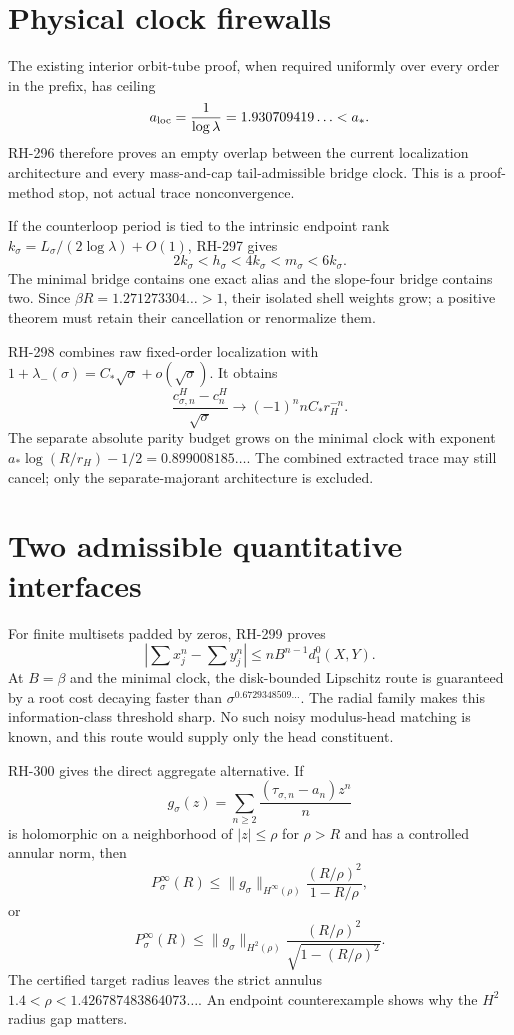 \documentclass[11pt]{article}
\theoremstyle{remark}\newtheorem{remark}[proposition]{Remark}
\begin{document}
\section{Physical clock firewalls}
The existing interior orbit-tube proof, when required uniformly over every
order in the prefix, has ceiling
\[
 a_{\rm loc}=\frac1{\log\lambda}
=1.930709419\ldots<a_*.
\]
RH-296 therefore proves an empty overlap between the current localization
architecture and every mass-and-cap tail-admissible bridge clock.  This is a
proof-method stop, not actual trace nonconvergence.

If the counterloop period is tied to the intrinsic endpoint rank
$k_\sigma=L_\sigma/(2\log\lambda)+O(1)$, RH-297 gives
\[
 2k_\sigma<h_\sigma<4k_\sigma<m_\sigma<6k_\sigma.
\]
The minimal bridge contains one exact alias and the slope-four bridge
contains two.  Since
$\beta R=1.271273304\ldots>1$, their isolated shell weights grow; a positive
theorem must retain their cancellation or renormalize them.

RH-298 combines raw fixed-order localization with
$1+\lambda_-(\sigma)=C_*\sqrt\sigma+o(\sqrt\sigma)$.  It obtains
\[
 \frac{c^H_{\sigma,n}-c^H_n}{\sqrt\sigma}
 \to(-1)^n nC_*r_H^{-n}.
\]
The separate absolute parity budget grows on the minimal clock with exponent
$a_*\log(R/r_H)-1/2=0.899008185\ldots$.  The combined extracted trace may
still cancel; only the separate-majorant architecture is excluded.

\section{Two admissible quantitative interfaces}
For finite multisets padded by zeros, RH-299 proves
\[
 |\sum x_j^n-\sum y_j^n|\le nB^{n-1}d_1^0(X,Y).
\]
At $B=\beta$ and the minimal clock, the disk-bounded Lipschitz route is
guaranteed by a root cost decaying faster than
$\sigma^{0.6729348509\ldots}$.  The radial family makes this
information-class threshold sharp.  No such noisy modulus-head matching is
known, and this route would supply only the head constituent.

RH-300 gives the direct aggregate alternative.  If
\[
 g_\sigma(z)=\sum_{n\ge2}\frac{(\tau_{\sigma,n}-a_n)z^n}{n}
\]
is holomorphic on a neighborhood of $|z|\le\rho$ for $\rho>R$ and has a
controlled annular norm, then
\[
 P_\sigma^\infty(R)\le
 \|g_\sigma\|_{H^\infty(\rho)}
 \frac{(R/\rho)^2}{1-R/\rho},
\]
or
\[
 P_\sigma^\infty(R)\le
 \|g_\sigma\|_{H^2(\rho)}
 \frac{(R/\rho)^2}{\sqrt{1-(R/\rho)^2}}.
\]
The certified target radius leaves the strict annulus
$1.4<\rho<1.426787483864073\ldots$.  An endpoint counterexample shows why
the $H^2$ radius gap matters.
\end{document}
